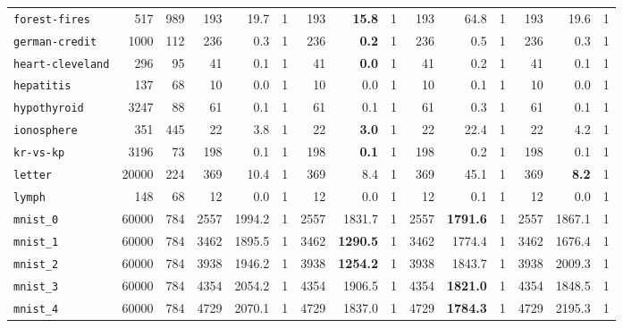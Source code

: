 \begin{tabular}{lccrrrrrrrrrrrr}
\texttt{forest-fires} & \multicolumn{1}{r}{517} & \multicolumn{1}{r}{989}  & 193 & 19.7 & 1 & 193 & \textbf{15.8} & 1 & 193 & 64.8 & 1 & 193 & 19.6 & 1\\
\texttt{german-credit} & \multicolumn{1}{r}{1000} & \multicolumn{1}{r}{112}  & 236 & 0.3 & 1 & 236 & \textbf{0.2} & 1 & 236 & 0.5 & 1 & 236 & 0.3 & 1\\
\texttt{heart-cleveland} & \multicolumn{1}{r}{296} & \multicolumn{1}{r}{95}  & 41 & 0.1 & 1 & 41 & \textbf{0.0} & 1 & 41 & 0.2 & 1 & 41 & 0.1 & 1\\
\texttt{hepatitis} & \multicolumn{1}{r}{137} & \multicolumn{1}{r}{68}  & 10 & 0.0 & 1 & 10 & 0.0 & 1 & 10 & 0.1 & 1 & 10 & 0.0 & 1\\
\texttt{hypothyroid} & \multicolumn{1}{r}{3247} & \multicolumn{1}{r}{88}  & 61 & 0.1 & 1 & 61 & 0.1 & 1 & 61 & 0.3 & 1 & 61 & 0.1 & 1\\
\texttt{ionosphere} & \multicolumn{1}{r}{351} & \multicolumn{1}{r}{445}  & 22 & 3.8 & 1 & 22 & \textbf{3.0} & 1 & 22 & 22.4 & 1 & 22 & 4.2 & 1\\
\texttt{kr-vs-kp} & \multicolumn{1}{r}{3196} & \multicolumn{1}{r}{73}  & 198 & 0.1 & 1 & 198 & \textbf{0.1} & 1 & 198 & 0.2 & 1 & 198 & 0.1 & 1\\
\texttt{letter} & \multicolumn{1}{r}{20000} & \multicolumn{1}{r}{224}  & 369 & 10.4 & 1 & 369 & 8.4 & 1 & 369 & 45.1 & 1 & 369 & \textbf{8.2} & 1\\
\texttt{lymph} & \multicolumn{1}{r}{148} & \multicolumn{1}{r}{68}  & 12 & 0.0 & 1 & 12 & 0.0 & 1 & 12 & 0.1 & 1 & 12 & 0.0 & 1\\
\texttt{mnist\_0} & \multicolumn{1}{r}{60000} & \multicolumn{1}{r}{784}  & 2557 & 1994.2 & 1 & 2557 & 1831.7 & 1 & 2557 & \textbf{1791.6} & 1 & 2557 & 1867.1 & 1\\
\texttt{mnist\_1} & \multicolumn{1}{r}{60000} & \multicolumn{1}{r}{784}  & 3462 & 1895.5 & 1 & 3462 & \textbf{1290.5} & 1 & 3462 & 1774.4 & 1 & 3462 & 1676.4 & 1\\
\texttt{mnist\_2} & \multicolumn{1}{r}{60000} & \multicolumn{1}{r}{784}  & 3938 & 1946.2 & 1 & 3938 & \textbf{1254.2} & 1 & 3938 & 1843.7 & 1 & 3938 & 2009.3 & 1\\
\texttt{mnist\_3} & \multicolumn{1}{r}{60000} & \multicolumn{1}{r}{784}  & 4354 & 2054.2 & 1 & 4354 & 1906.5 & 1 & 4354 & \textbf{1821.0} & 1 & 4354 & 1848.5 & 1\\
\texttt{mnist\_4} & \multicolumn{1}{r}{60000} & \multicolumn{1}{r}{784}  & 4729 & 2070.1 & 1 & 4729 & 1837.0 & 1 & 4729 & \textbf{1784.3} & 1 & 4729 & 2195.3 & 1\\

\end{tabular}
